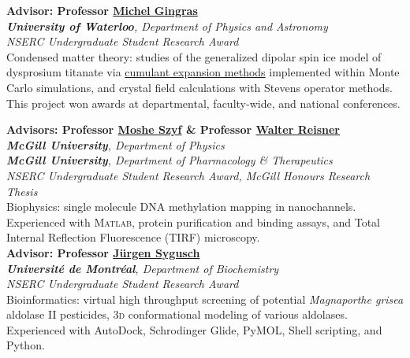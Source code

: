 \documentclass[12pt, letterpaper]{article}
\newcommand{\years}[1]{\marginnote{\normalsize #1}}
\begin{document}
\years{5/2012-8/2012}\textbf{Advisor: Professor \href{https://uwaterloo.ca/physics-astronomy/people-profiles/michel-gingras}{Michel Gingras}}\\ 
\emph{\textbf{University of Waterloo}, Department of Physics and Astronomy}\\
\emph{NSERC Undergraduate Student Research Award}\\
Condensed matter theory: studies of the generalized dipolar spin ice model of dysprosium titanate via \href{https://github.com/altosaar/cumulantexpander}{cumulant expansion methods} implemented within Monte Carlo simulations, and crystal field calculations with Stevens operator methods.  This project won awards at departmental, faculty-wide, and national conferences.\newpage

\years{5/2011-4/2012}\textbf{Advisors: Professor \href{http://szyf-lab.com/}{Moshe Szyf} \& Professor \href{http://www.physics.mcgill.ca/~reisner/}{Walter Reisner}}\\ 
\emph{\textbf{McGill University}, Department of Physics}\\
\emph{\textbf{McGill University}, Department of Pharmacology \& Therapeutics}\\
\emph{NSERC Undergraduate Student Research Award, McGill Honours Research Thesis}\\
Biophysics: single molecule DNA methylation mapping in nanochannels. Experienced with \textsc{Matlab}, protein purification and binding assays, and Total Internal Reflection Fluorescence (TIRF) microscopy.\\

\years{5/2010-8/2010}\textbf{Advisor: Professor \href{http://esilrch1.esi.umontreal.ca/~syguschj/home.html}{Jürgen Sygusch}}\\ 
\emph{\textbf{Université de Montréal}, Department of Biochemistry}\\
\emph{NSERC Undergraduate Student Research Award}\\
Bioinformatics: virtual high throughput screening of potential \emph{Magnaporthe grisea} aldolase II pesticides, 3\textsc{d} conformational modeling of various aldolases. Experienced with AutoDock, Schrodinger Glide, PyMOL, Shell scripting, and Python.

\end{document}
